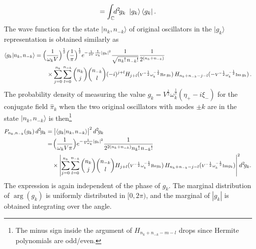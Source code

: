 \documentclass[../QFT_main.tex]{subfiles}
\begin{document}
\begin{mytheorem}
\begin{align}
    = \int_{\mathbb{C}}\!\!d^2\! g_k \,\,\, |g_k\rangle \, \langle g_k |\,.
\end{align}
%
The wave function for the state $|n_k, n_{-k}\rangle$ of original oscillators in the $|g_k\rangle$ representation is obtained similarly as
{\small
\begin{align}
    \langle g_k | n_k, n_{-k} \rangle 
    &= \Big(\frac{1}{\omega_k V}\Big)^{\frac{1}{2}} \Big( \frac{1}{\pi} \Big)^{\frac{1}{2}} 
    e^{-\frac{1}{2V}\frac{1}{\omega_k} |g_k|^2} \frac{1}{\sqrt{n_k!\, n_{-k}!}} \frac{1}{2^{(n_k + n_{-k})}}
    \\
    &\qquad\times \sum_{j=0}^{n_k} \sum_{l=0}^{n_{-k}} \binom{n_k}{j} \binom{n_{-k}}{l} (-i)^{j+l} H_{j+l}(\text{\scriptsize $V^{-\frac{1}{2}}\omega_k^{-\frac{1}{2}}\text{Re}\,g_k$})\, H_{n_k + n_{-k} - j-l}(-\text{\scriptsize $V^{-\frac{1}{2}}\omega_k^{-\frac{1}{2}}\text{Im}\,g_k$})\,.
\end{align}
}
%
The probability density of measuring the value $g_k=V^{\frac{1}{2}}\omega_k^{\frac{1}{2}}( \eta_+ - i \xi_-)$ for the conjugate field $\hat{\pi}_k$ when the two original oscillators with modes $\pm k$ are in the state $|n_k, n_{-k}\rangle$ is then\footnote{The minus sign inside the argument of $H_{n_k+n_{-k}-m-l}$ drops since Hermite polynomials are odd/even.}
{\small
\begin{align}
    P_{n_k, n_{-k}}(g_k) \,d^2\!g_k &= \big|\langle g_k | n_k, n_{-k} \rangle\big|^2 \,d^2\!g_k\,
    \\
    &=\! \Big(\frac{1}{\omega_k V \pi}\Big) 
    e^{-\frac{1}{V \omega_k} |g_k|^2} \frac{1}{2^{2(n_k + n_{-k})}n_k!\, n_{-k}!} 
    \\
    & \quad\times
    \left| \sum_{j=0}^{n_k} \sum_{l=0}^{n_{-k}} \binom{n_k}{j} \binom{n_{-k}}{l}  H_{j+l}(\text{\scriptsize $V^{-\frac{1}{2}}\omega_k^{-\frac{1}{2}}\text{Re}g_k$})\, H_{n_k + n_{-k} - j-l}(\text{\scriptsize $V^{-\frac{1}{2}}\omega_k^{-\frac{1}{2}}\text{Im}g_k$}) \right|^2\! \!d^2\!g_k.
\end{align}
}
The expression is again independent of the phase of $g_k$.
The marginal distribution of $\arg(g_k)$ is uniformly distributed in $[0,2\pi)$, and the marginal of $|g_k|$ is obtained integrating over the angle.


\end{mytheorem}
\end{document}
